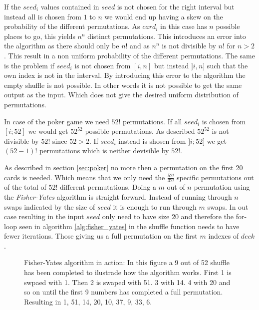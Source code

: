 \documentclass[twoside,11pt,openright]{report}
\newcommand{\FY}{\textit{Fisher-Yates} }
\begin{document}
If the $seed_i$ values contained in $seed$ is not chosen for the right interval but instead all is chosen from $1$ to $n$ we would end up having a skew on the probability of the different permutations. As $card_i$ in this case has $n$ possible places to go, this yields $n^n$ distinct permutations. This introduces an error into the algorithm as there should only be $n!$ and as $n^n$ is not divisible by $n!$ for $n>2$. This result in a non uniform probability of the different permutations. The same is the problem if $seed_i$ is not chosen from $[i,n]$ but instead $]i,n]$ such that the own index is not in the interval. By introducing this error to the algorithm the empty shuffle is not possible. In other words it is not possible to get the same output as the input. Which does not give the desired uniform distribution of permutations.

\bigskip

In case of the poker game we need $52!$ permutations. If all $seed_i$ is chosen from $[i;52]$ we would get $52^{52}$ possible permutations. As described $52^{52}$ is not divisible by $52!$ since $52>2$. If $seed_i$ instead is shosen from $]i;52]$ we get $(52-1)!$ permutations which is neither devisible by $52!$.

\bigskip

As described in section \ref{sec:poker} no more then a permutation on the first 20 cards is needed. Which means that we only need the $\frac{52!}{32!}$ specific permutations out of the total of $52!$ different permutations. Doing a $m$ out of $n$ permutation using the \FY algorithm is straight forward. Instead of running through $n$ swaps indicated by the size of $seed$ it is enough to run through $m$ swaps. In out case resulting in the input $seed$ only need to have size $20$ and therefore the for-loop seen in algorithm \ref{alg:fisher_yates} in the shuffle function needs to have fewer iterations. Those giving us a full permutation on the first $m$ indexes of $deck$.

\bigskip

\begin{figure}
\centering
\scalebox{1.5}{}
\caption{Fisher-Yates algorithm in action: In this figure a 9 out of 52 shuffle has been completed to ilustrade how the algorithm works. First 1 is swpaed with 1. Then 2 is swaped with 51. 3 with 14. 4 with 20 and so on until the first 9 numbers has completed a full permutation. Resulting in 1, 51, 14, 20, 10, 37, 9, 33, 6.}
\label{fig:fisher_yates}
\end{figure}
\end{document}
